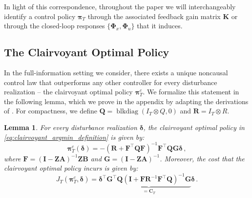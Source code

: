 \documentclass[conference]{IEEEtran}
\newtheorem{lemma}{Lemma}
\begin{document}
In light of this correspondence, throughout the paper we will interchangeably identify a control policy $\bm{\pi}_T$ through the associated feedback gain matrix  $\mathbf{K}$ or through the closed-loop responses $\{\bm{\Phi}_x, \bm{\Phi}_u\}$ that it induces.

\subsection{The Clairvoyant Optimal Policy}
In the full-information setting we consider, there exists a unique noncausal control law that outperforms any other controller for every disturbance realization – the clairvoyant optimal policy $\bm{\pi}^c_T$. We formalize this statement in the following lemma, which we prove in the appendix by adapting the derivations of \cite{hassibi1999indefinite, martin2022safe}. For compactness, we define $\mathbf{Q} = \operatorname{blkdiag}(I_T \otimes Q, 0)$ and $\mathbf{R} = I_{T} \otimes R$.
\begin{lemma}
    For every disturbance realization $\bm{\delta}$, the clairvoyant optimal policy in \eqref{eq:clairvoyant_argmin_definition} is given by:
    \label{le:clairvoyant_optimal_policy}
    \begin{equation}
        \label{eq:clairvoyant_controller_definition}
        \bm{\pi}^c_T(\bm{\delta}) = -(\mathbf{R} + \mathbf{F}^\top\mathbf{Q} \mathbf{F})^{-1}\mathbf{F}^\top\mathbf{Q}\mathbf{G}\bm{\delta}\,,
    \end{equation}
    where $\mathbf{F} = (\mathbf{I} - \mathbf{Z} \mathbf{A})^{-1} \mathbf{Z} \mathbf{B}$ and $\mathbf{G} = (\mathbf{I} - \mathbf{Z} \mathbf{A})^{-1}$. Moreover, the cost that the clairvoyant optimal policy incurs is given by:
    \begin{equation}
        \label{eq:clairvoyant_controller_cost_incurred}
        J_T(\bm{\pi}^c_T, \bm{\delta}) = \bm{\delta}^\top \underbrace{\mathbf{G}^\top \mathbf{Q}(\mathbf{I} + \mathbf{F}\mathbf{R}^{-1}\mathbf{F}^\top\mathbf{Q})^{-1} \mathbf{G}}_{= \mathbf{C}_T} \bm{\delta}\,.%
    \end{equation}
\end{lemma}
\end{document}
